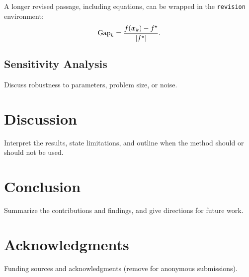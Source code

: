 


\begin{revision}
A longer revised passage, including equations, can be wrapped in the \texttt{revision} environment:
\begin{equation}
  \mathrm{Gap}_k = \frac{f(\bm{x}_k)-f^\star}{\lvert f^\star\rvert}.
\end{equation}
\end{revision}

\subsection{Sensitivity Analysis}\label{sec:sensitivity}
Discuss robustness to parameters, problem size, or noise.

\section{Discussion}\label{sec:discussion}
Interpret the results, state limitations, and outline when the method should or should not be used.

\section{Conclusion}\label{sec:conclusion}
Summarize the contributions and findings, and give directions for future work.

\section*{Acknowledgments}
Funding sources and acknowledgments (remove for anonymous submissions).
